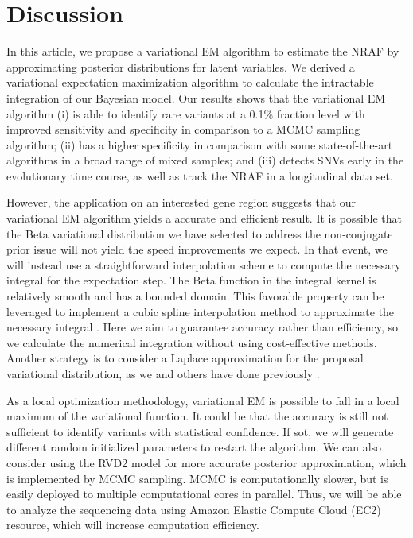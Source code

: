 \documentclass[11pt,reqno]{amsart}
\begin{document}
\section{Discussion}
In this article, we propose a variational EM algorithm to estimate the NRAF by approximating posterior distributions for latent variables.
We derived a variational expectation maximization algorithm to calculate the intractable integration of our Bayesian model.
Our results shows that the variational EM algorithm
(i) is able to identify rare variants at a 0.1\% fraction level with improved sensitivity and specificity in comparison to a MCMC sampling algorithm;
(ii) has a higher specificity in comparison with some state-of-the-art algorithms in a broad range of mixed samples;
and (iii) detects SNVs early in the evolutionary time course, as well as track the NRAF in a longitudinal data set.

However, the application on an interested gene region suggests that our variational EM algorithm yields a accurate and efficient result.
It is possible that the Beta variational distribution we have selected to address the non-conjugate prior issue will not yield the speed improvements we expect.
In that event, we will instead use a straightforward interpolation scheme to compute the necessary integral for the expectation step.
The Beta function in the integral kernel is relatively smooth and has a bounded domain.
This favorable property can be leveraged to implement a cubic spline interpolation method to approximate the necessary integral \citep{mckinley1998cubic}.
Here we aim to guarantee accuracy rather than efficiency, so we calculate the numerical integration without using cost-effective methods.
Another strategy is to consider a Laplace approximation for the proposal variational distribution, as we and others have done previously \citep{saddiki2014glad, wang2013variational}.

As a local optimization methodology, variational EM is possible to fall in a local maximum of the variational function.
It could be that the accuracy is still not sufficient to identify variants with statistical confidence.
If sot, we will generate different random initialized parameters to restart the algorithm.
We can also consider using the RVD2 model for more accurate posterior approximation, which is implemented by MCMC sampling.
MCMC is computationally slower, but is easily deployed to multiple computational cores in parallel.
Thus, we will be able to analyze the sequencing data using Amazon Elastic Compute Cloud (EC2) resource, which will increase computation efficiency.
\end{document}
